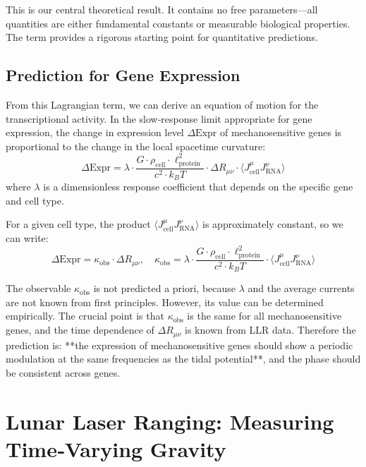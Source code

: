 \documentclass[12pt,a4paper]{article}
\theoremstyle{remark}
\begin{document}
	This is our central theoretical result. It contains no free parameters—all quantities are either fundamental constants or measurable biological properties. The term provides a rigorous starting point for quantitative predictions.
	
	\subsection{Prediction for Gene Expression}
	
	From this Lagrangian term, we can derive an equation of motion for the transcriptional activity. In the slow‑response limit appropriate for gene expression, the change in expression level \(\Delta\text{Expr}\) of mechanosensitive genes is proportional to the change in the local spacetime curvature:
	\begin{equation}
		\Delta\text{Expr} = \lambda \cdot \frac{G \cdot \rho_{\text{cell}} \cdot \ell_{\text{protein}}^2}{c^2 \cdot k_B T} \cdot \Delta R_{\mu\nu} \cdot \langle J_{\text{cell}}^\mu J_{\text{RNA}}^\nu \rangle
		\label{eq:prediction-raw}
	\end{equation}
	where \(\lambda\) is a dimensionless response coefficient that depends on the specific gene and cell type.
	
	For a given cell type, the product \(\langle J_{\text{cell}}^\mu J_{\text{RNA}}^\nu \rangle\) is approximately constant, so we can write:
	\begin{equation}
		\Delta\text{Expr} = \kappa_{\text{obs}} \cdot \Delta R_{\mu\nu}, \quad 
		\kappa_{\text{obs}} = \lambda \cdot \frac{G \cdot \rho_{\text{cell}} \cdot \ell_{\text{protein}}^2}{c^2 \cdot k_B T} \cdot \langle J_{\text{cell}}^\mu J_{\text{RNA}}^\nu \rangle
		\label{eq:prediction-simple}
	\end{equation}
	
	The observable \(\kappa_{\text{obs}}\) is not predicted a priori, because \(\lambda\) and the average currents are not known from first principles. However, its value can be determined empirically. The crucial point is that \(\kappa_{\text{obs}}\) is the same for all mechanosensitive genes, and the time dependence of \(\Delta R_{\mu\nu}\) is known from LLR data. Therefore the prediction is: **the expression of mechanosensitive genes should show a periodic modulation at the same frequencies as the tidal potential**, and the phase should be consistent across genes.
	
	\section{Lunar Laser Ranging: Measuring Time‑Varying Gravity}
	\label{sec:llr}
	
\end{document}

